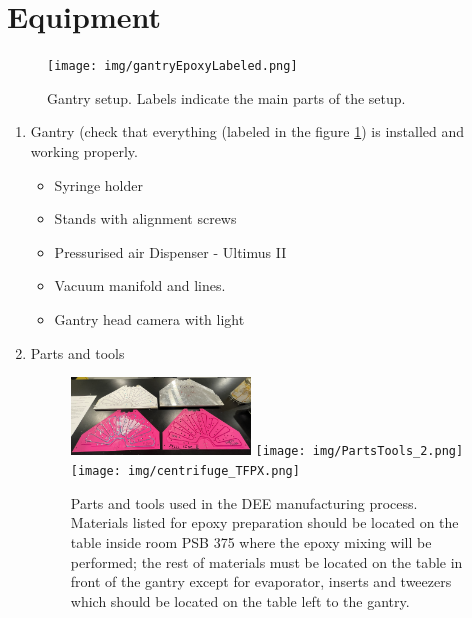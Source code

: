 \documentclass[12pt]{cornelltfpxsop}
\begin{document}
\section{Equipment}
\begin{center}
\begin{figure}[h!]
\texttt{[image: img/gantryEpoxyLabeled.png]}
\caption{Gantry setup. Labels indicate the main parts of the setup.}
\label{gantry_setup}
\end{figure}
\end{center}

\begin{enumerate}

\item Gantry (check that everything (labeled in the figure  \ref{gantry_setup}) is installed and working properly. 
    \begin{itemize}
        \item Syringe holder 
        \item Stands with alignment screws
        \item Pressurised air Dispenser - Ultimus II
        \item Vacuum manifold and lines.
        \item Gantry head camera with light
    \end{itemize}
\item Parts and tools
\begin{center}
\begin{figure}[h]
\includegraphics[width=0.45\textwidth,angle = 0]{img/PartsTools_1.png}
\texttt{[image: img/PartsTools\_2.png]}\\
\texttt{[image: img/centrifuge\_TFPX.png]}
\caption{Parts and tools used in the DEE manufacturing process. Materials listed for epoxy preparation should be located on the table inside room PSB 375 where the epoxy mixing will be performed; the rest of materials must be located on the table in front of the gantry except for evaporator, inserts and tweezers which should be located on the table left to the gantry.}
\label{Parts ands tools}
\end{figure}
\end{center}

\end{enumerate}
\end{document}

